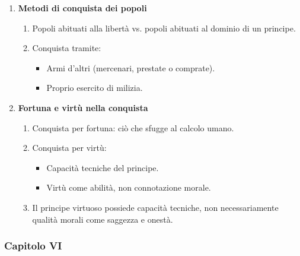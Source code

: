 \documentclass{article}
\begin{document}
\begin{enumerate}
    \item \textbf{Metodi di conquista dei popoli}
    \begin{enumerate}[label*=\arabic*.]
        \item Popoli abituati alla libertà vs. popoli abituati al dominio di un principe.
        \item Conquista tramite:
        \begin{itemize}
            \item Armi d'altri (mercenari, prestate o comprate).
            \item Proprio esercito di milizia.
        \end{itemize}
    \end{enumerate}

    \item \textbf{Fortuna e virtù nella conquista}
    \begin{enumerate}[label*=\arabic*.]
        \item Conquista per fortuna: ciò che sfugge al calcolo umano.
        \item Conquista per virtù:
        \begin{itemize}
            \item Capacità tecniche del principe.
            \item Virtù come abilità, non connotazione morale.
        \end{itemize}
        \item Il principe virtuoso possiede capacità tecniche, non necessariamente qualità morali come saggezza e onestà.
    \end{enumerate}
\end{enumerate}

\newpage
\subsubsection{Capitolo VI}
\end{document}
